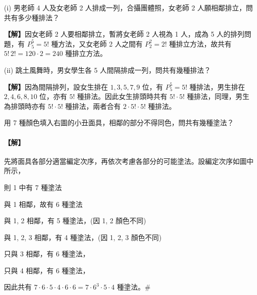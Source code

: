 \vspace{1em}
\begin{example}\label{ex:b5s-2-11}
(i) 男老師 4 人及女老師 2 人排成一列，合攝團體照，女老師 2 人願相鄰排立，問共有多少種排法？
\par\smallskip\noindent\textbf{【解】}\quad 因女老師 2 人要相鄰排立，暫將女老師 2 人視為 1 人，成為 5 人的排列問題，有 $P_5^5 = 5!$ 種方法，又女老師 2 人之間有 $P_2^2 = 2!$ 種排立方法，故共有 $5! \, 2! = 120 \cdot 2 = 240$ 種排立方法。

\indent(ii) 跳土風舞時，男女學生各 5 人間隔排成一列，問共有幾種排法？
\par\smallskip\noindent\textbf{【解】}\quad 因為間隔排列，設女生排在 $1, 3, 5, 7, 9$ 位，有 $P_5^5 = 5!$ 種排法，男生排在 $2, 4, 6, 8, 10$ 位，亦有 $5!$ 種排法。因此女生排頭時共有 $5! \cdot 5!$ 種排法，同理，男生為排頭時亦有 $5! \cdot 5!$ 種排法，兩者合有 $2 \cdot 5! \cdot 5!$ 種排法。
\end{example}

\vspace{1em}
\noindent
\begin{minipage}[t]{0.66\textwidth}
\begin{discussion}\label{disc:b5s-2-4}
用 7 種顏色填入右圖的小丑面具，相鄰的部分不得同色，問共有幾種塗法？
\end{discussion}
\paragraph{【解】}
先將面具各部分適當編定次序，再依次考慮各部分的可能塗法。設編定次序如圖中所示，

\indent 則 1 中有 7 種塗法

 與 1 相鄰，故有 6 種塗法

 與 1, 2 相鄰，有 5 種塗法，(因 1, 2 顏色不同)

 與 1, 2, 3 相鄰，有 4 種塗法，(因 1, 2, 3 顏色不同)

 只與 3 相鄰，有 6 種塗法，

 只與 4 相鄰，有 6 種塗法，

因此共有 $7 \cdot 6 \cdot 5 \cdot 4 \cdot 6 \cdot 6 = 7 \cdot 6^3 \cdot 5 \cdot 4$ 種塗法。\hfill\#
\end{minipage}\hfill
\begin{minipage}[t]{0.32\textwidth}
\centering
\vspace{1em}
\end{minipage}

